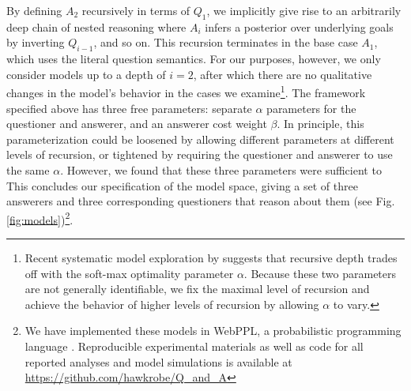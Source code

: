 \documentclass[11pt, floatsintext]{apa6}
\begin{document}
By defining $A_2$ recursively in terms of $Q_1$, we implicitly give rise to an arbitrarily deep chain of nested reasoning where $A_{i}$ infers a posterior over underlying goals by inverting $Q_{i-1}$, and so on. This recursion terminates in the base case $A_1$, which uses the literal question semantics. For our purposes, however, we only consider models up to a depth of $i=2$, after which there are no qualitative changes in the model's behavior in the cases we examine\footnote{Recent systematic model exploration by  suggests that recursive depth trades off with the soft-max optimality parameter $\alpha$. Because these two parameters are not generally identifiable, we fix the maximal level of recursion and achieve the behavior of higher levels of recursion by allowing $\alpha$ to vary.}. 
The framework specified above has three free parameters: separate $\alpha$ parameters for the questioner and answerer, and an answerer cost weight $\beta$.
In principle, this parameterization could be loosened by allowing different parameters at different levels of recursion, or tightened by requiring the questioner and answerer to use the same $\alpha$. 
However, we found that these three parameters were sufficient to 
This concludes our specification of the model space, giving a set of three answerers and three corresponding questioners that reason about them (see Fig. \ref{fig:models})\footnote{We have implemented these models in WebPPL, a probabilistic programming language \cite{GoodmanStuhlmuller14_DIPPL}. Reproducible experimental materials as well as code for all reported analyses and model simulations is available at \url{https://github.com/hawkrobe/Q\_and\_A}}.
 

%
\end{document}
